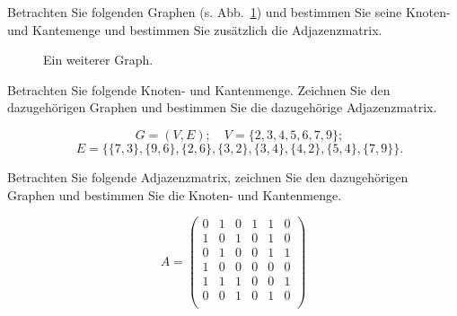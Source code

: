 \begin{kontr}
Betrachten Sie folgenden Graphen (s. Abb.~\ref{fig:kont:graph}) und bestimmen Sie seine Knoten- und Kantemenge und bestimmen Sie zusätzlich die Adjazenzmatrix.

\begin{figure}[htb]
\begin{center}
\caption{Ein weiterer Graph.}
\label{fig:kont:graph}
\end{center}
\end{figure}

\end{kontr}

\begin{kontr}
Betrachten Sie folgende Knoten- und Kantenmenge. Zeichnen Sie den dazugehörigen Graphen und bestimmen Sie die dazugehörige Adjazenzmatrix.

\[ \quad G = (V, E); \quad V = \{2,3,4,5,6,7,9\}; \] 
\[\quad E =  \{ \{7,3\},\{9,6\}, \{2,6\}, \{3,2\}, \{3,4\}, \{4,2\}, \{5,4\}, \{7,9\}\}. \]

\end{kontr}

\begin{kontr}
Betrachten Sie folgende Adjazenzmatrix, zeichnen Sie den dazugehörigen Graphen und bestimmen Sie die Knoten- und Kantenmenge.

\[A =  \begin{pmatrix}
  0 & 1 & 0 & 1 & 1 & 0 \\
  1 & 0 & 1 & 0 & 1 & 0 \\
  0 & 1 & 0 & 0 & 1 & 1 \\
  1 & 0 & 0 & 0 & 0 & 0 \\
  1 & 1 & 1 & 0 & 0 & 1 \\
  0 & 0 & 1 & 0 & 1 & 0 \\
 \end{pmatrix}
  \]
\end{kontr}

